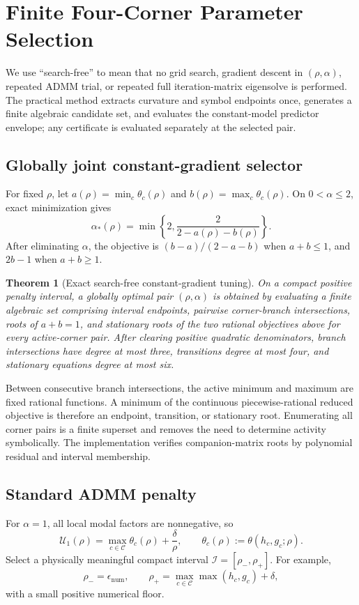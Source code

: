 \documentclass[pdflatex,iicol,sn-mathphys-num]{sn-jnl}
\newtheorem{theorem}{Theorem}[section]
\theoremstyle{definition}\newtheorem{definition}[theorem]{Definition}\newtheorem{remark}[theorem]{Remark}
\begin{document}
\endgroup
\section{Finite Four-Corner Parameter Selection}
We use ``search-free'' to mean that no grid search, gradient descent in $(\rho,\alpha)$, repeated ADMM trial, or repeated full iteration-matrix eigensolve is performed. The practical method extracts curvature and symbol endpoints once, generates a finite algebraic candidate set, and evaluates the constant-model predictor envelope; any certificate is evaluated separately at the selected pair.

\subsection{Globally joint constant-gradient selector}
For fixed $\rho$, let $a(\rho)=\min_c\theta_c(\rho)$ and $b(\rho)=\max_c\theta_c(\rho)$.  On $0<\alpha\le2$, exact minimization gives
\[
\alpha_*(\rho)=\min\left\{2,\frac{2}{2-a(\rho)-b(\rho)}\right\}.
\]
After eliminating $\alpha$, the objective is $(b-a)/(2-a-b)$ when $a+b\le1$, and $2b-1$ when $a+b\ge1$.

\begin{theorem}[Exact search-free constant-gradient tuning]\label{thm:joint_constant}
On a compact positive penalty interval, a globally optimal pair $(\rho,\alpha)$ is obtained by evaluating a finite algebraic set comprising interval endpoints, pairwise corner-branch intersections, roots of $a+b=1$, and stationary roots of the two rational objectives above for every active-corner pair.  After clearing positive quadratic denominators, branch intersections have degree at most three, transitions degree at most four, and stationary equations degree at most six.
\end{theorem}
Between consecutive branch intersections, the active minimum and maximum are fixed rational functions.  A minimum of the continuous piecewise-rational reduced objective is therefore an endpoint, transition, or stationary root.  Enumerating all corner pairs is a finite superset and removes the need to determine activity symbolically.  The implementation verifies companion-matrix roots by polynomial residual and interval membership.

\subsection{Standard ADMM penalty}
For $\alpha=1$, all local modal factors are nonnegative, so
\begin{equation}
\mathcal U_{1}(\rho)
=\max_{c\in\mathcal C}\theta_c(\rho)+\frac{\delta}{\rho},
\qquad
\theta_c(\rho):=\theta(h_c,g_c;\rho).
\label{eq:standard_cert}
\end{equation}
Select a physically meaningful compact interval $\mathcal I=[\rho_-,\rho_+]$. For example,
\[
\rho_- = \epsilon_{\mathrm{num}},
\qquad
\rho_+=\max_{c\in\mathcal C}\max(h_c,g_c)+\delta,
\]
with a small positive numerical floor.
\end{document}
